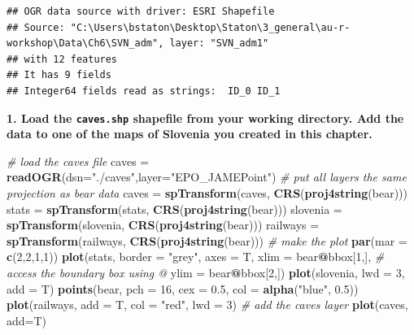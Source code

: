 \documentclass[]{book}
\newenvironment{Shaded}{\begin{snugshade}}{\end{snugshade}}
\newcommand{\CommentTok}[1]{\textcolor[rgb]{0.56,0.35,0.01}{\textit{#1}}}
\newcommand{\DataTypeTok}[1]{\textcolor[rgb]{0.13,0.29,0.53}{#1}}
\newcommand{\DecValTok}[1]{\textcolor[rgb]{0.00,0.00,0.81}{#1}}
\newcommand{\FloatTok}[1]{\textcolor[rgb]{0.00,0.00,0.81}{#1}}
\newcommand{\KeywordTok}[1]{\textcolor[rgb]{0.13,0.29,0.53}{\textbf{#1}}}
\newcommand{\NormalTok}[1]{#1}
\newcommand{\OperatorTok}[1]{\textcolor[rgb]{0.81,0.36,0.00}{\textbf{#1}}}
\newcommand{\StringTok}[1]{\textcolor[rgb]{0.31,0.60,0.02}{#1}}
\begin{document}
\begin{verbatim}
## OGR data source with driver: ESRI Shapefile 
## Source: "C:\Users\bstaton\Desktop\Staton\3_general\au-r-workshop\Data\Ch6\SVN_adm", layer: "SVN_adm1"
## with 12 features
## It has 9 fields
## Integer64 fields read as strings:  ID_0 ID_1
\end{verbatim}

\textbf{1. Load the \texttt{caves.shp} shapefile \citep{caves-cite} from your working directory. Add the data to one of the maps of Slovenia you created in this chapter.}

\begin{Shaded}
\begin{Highlighting}[]
\CommentTok{# load the caves file}
\NormalTok{caves =}\StringTok{ }\KeywordTok{readOGR}\NormalTok{(}\DataTypeTok{dsn=}\StringTok{"./caves"}\NormalTok{,}\DataTypeTok{layer=}\StringTok{"EPO_JAMEPoint"}\NormalTok{)}
\CommentTok{# put all layers the same projection as bear data}
\NormalTok{caves =}\StringTok{ }\KeywordTok{spTransform}\NormalTok{(caves, }\KeywordTok{CRS}\NormalTok{(}\KeywordTok{proj4string}\NormalTok{(bear)))}
\NormalTok{stats =}\StringTok{ }\KeywordTok{spTransform}\NormalTok{(stats, }\KeywordTok{CRS}\NormalTok{(}\KeywordTok{proj4string}\NormalTok{(bear)))}
\NormalTok{slovenia =}\StringTok{ }\KeywordTok{spTransform}\NormalTok{(slovenia, }\KeywordTok{CRS}\NormalTok{(}\KeywordTok{proj4string}\NormalTok{(bear)))}
\NormalTok{railways =}\StringTok{ }\KeywordTok{spTransform}\NormalTok{(railways, }\KeywordTok{CRS}\NormalTok{(}\KeywordTok{proj4string}\NormalTok{(bear)))}
\CommentTok{# make the plot}
\KeywordTok{par}\NormalTok{(}\DataTypeTok{mar =} \KeywordTok{c}\NormalTok{(}\DecValTok{2}\NormalTok{,}\DecValTok{2}\NormalTok{,}\DecValTok{1}\NormalTok{,}\DecValTok{1}\NormalTok{))}
\KeywordTok{plot}\NormalTok{(stats, }\DataTypeTok{border =} \StringTok{"grey"}\NormalTok{, }\DataTypeTok{axes =}\NormalTok{ T,}
     \DataTypeTok{xlim =}\NormalTok{ bear}\OperatorTok{@}\NormalTok{bbox[}\DecValTok{1}\NormalTok{,],  }\CommentTok{# access the boundary box using @}
     \DataTypeTok{ylim =}\NormalTok{ bear}\OperatorTok{@}\NormalTok{bbox[}\DecValTok{2}\NormalTok{,])}
\KeywordTok{plot}\NormalTok{(slovenia, }\DataTypeTok{lwd =} \DecValTok{3}\NormalTok{, }\DataTypeTok{add =}\NormalTok{ T)}
\KeywordTok{points}\NormalTok{(bear, }\DataTypeTok{pch =} \DecValTok{16}\NormalTok{, }\DataTypeTok{cex =} \FloatTok{0.5}\NormalTok{, }\DataTypeTok{col =} \KeywordTok{alpha}\NormalTok{(}\StringTok{"blue"}\NormalTok{, }\FloatTok{0.5}\NormalTok{))}
\KeywordTok{plot}\NormalTok{(railways, }\DataTypeTok{add =}\NormalTok{ T, }\DataTypeTok{col =} \StringTok{"red"}\NormalTok{, }\DataTypeTok{lwd =} \DecValTok{3}\NormalTok{)}
\CommentTok{# add the caves layer}
\KeywordTok{plot}\NormalTok{(caves, }\DataTypeTok{add=}\NormalTok{T)}
\end{Highlighting}
\end{Shaded}
\end{document}
